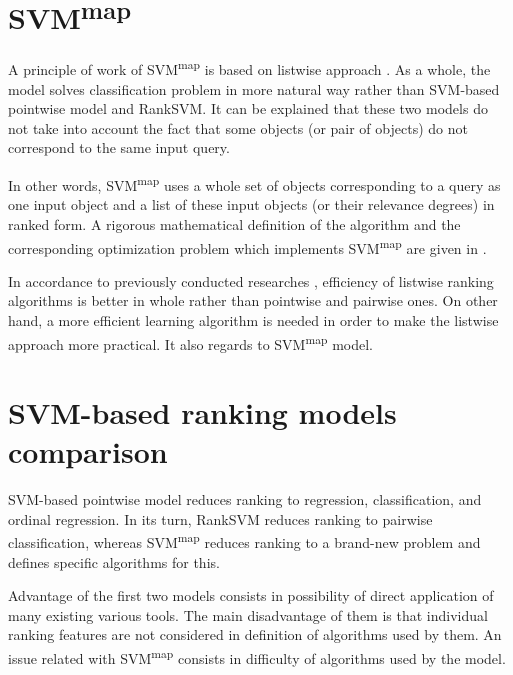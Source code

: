 \documentclass[12pt,a4paper,oneside]{article}
\begin{document}

\section{SVM\textsuperscript{map}}
\label{sec:svmmap}

\par
A principle of work of SVM\textsuperscript{map} is based on listwise approach . 
As a whole, the model solves classification problem in more natural way rather than SVM-based pointwise model and RankSVM. 
It can be explained that these two models do not take into account the fact that some objects (or pair of objects) do not correspond to the same input query.

\par
In other words, SVM\textsuperscript{map} uses a whole set of objects corresponding to a query as one input object and a list of these input objects (or their relevance degrees) in ranked form. 
A rigorous mathematical definition of the algorithm and the corresponding optimization problem which implements SVM\textsuperscript{map} are given in . 

\par
In accordance to previously conducted researches , efficiency of listwise ranking algorithms is better in whole rather than pointwise and pairwise ones. 
On other hand, a more efficient learning algorithm is needed in order to make the listwise approach more practical. 
It also regards to SVM\textsuperscript{map} model.


\section{SVM-based ranking models comparison}
\label{sec:svm_based_ranking_models_comparison}

\par
SVM-based pointwise model reduces ranking to regression, classification, and ordinal regression. 
In its turn, RankSVM reduces ranking to pairwise classification, whereas SVM\textsuperscript{map} reduces ranking to a brand-new problem and defines specific algorithms for this.

\par
Advantage of the first two models consists in possibility of direct application of many existing various tools. 
The main disadvantage of them is that individual ranking features are not considered in definition of algorithms used by them. 
An issue related with SVM\textsuperscript{map} consists in difficulty of algorithms used by the model.
\end{document}
